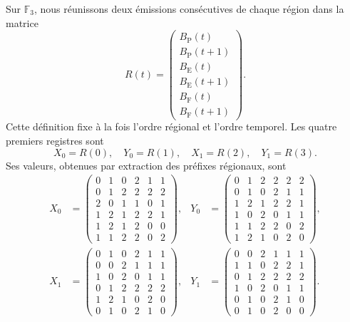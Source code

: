 Sur \(\mathbb F_3\), nous réunissons deux émissions consécutives de chaque région dans la matrice
\begin{equation}
 R(t)=
 \begin{pmatrix}
 B_{\mathrm P}(t)\\ B_{\mathrm P}(t+1)\\
 B_{\mathrm E}(t)\\ B_{\mathrm E}(t+1)\\
 B_{\mathrm F}(t)\\ B_{\mathrm F}(t+1)
 \end{pmatrix}.
 \label{act21:eq:df-registro-matricial}
\end{equation}
Cette définition fixe à la fois l'ordre régional et l'ordre temporel. Les
quatre premiers registres sont
\[
 X_0=R(0),\quad Y_0=R(1),\quad X_1=R(2),\quad Y_1=R(3).
\]
Ses valeurs, obtenues par extraction des préfixes régionaux, sont
\begin{align*}
 X_0&=\begin{pmatrix}
0&1&0&2&1&1\\0&1&2&2&2&2\\2&0&1&1&0&1\\
1&2&1&2&2&1\\1&2&1&2&0&0\\1&1&2&2&0&2
\end{pmatrix},&
 Y_0&=\begin{pmatrix}
0&1&2&2&2&2\\0&1&0&2&1&1\\1&2&1&2&2&1\\
1&0&2&0&1&1\\1&1&2&2&0&2\\1&2&1&0&2&0
\end{pmatrix},\\[1ex]
 X_1&=\begin{pmatrix}
0&1&0&2&1&1\\0&0&2&1&1&1\\1&0&2&0&1&1\\
0&1&2&2&2&2\\1&2&1&0&2&0\\0&1&0&2&1&0
\end{pmatrix},&
 Y_1&=\begin{pmatrix}
0&0&2&1&1&1\\1&1&0&2&2&1\\0&1&2&2&2&2\\
1&0&2&0&1&1\\0&1&0&2&1&0\\0&1&0&2&0&0
\end{pmatrix}.
\end{align*}

